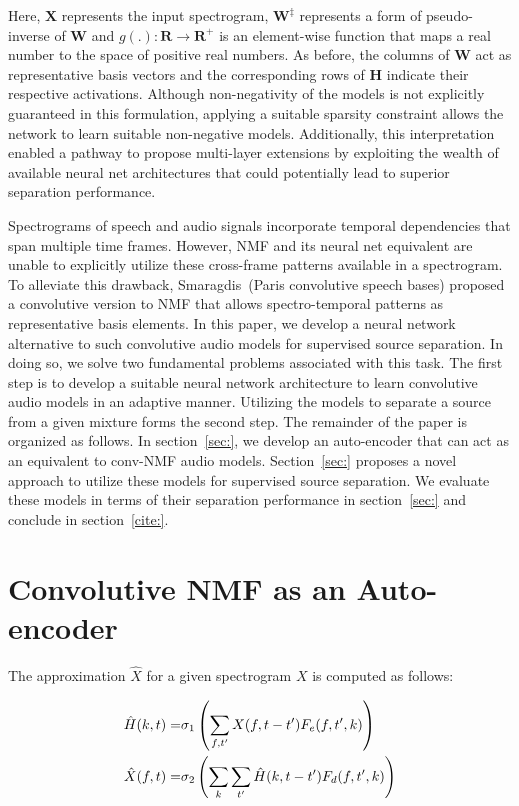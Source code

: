 \documentclass{article}
\begin{document}
Here, $\mathbf{X}$ represents the input spectrogram, $\mathbf{W^{\ddagger}}$ represents a form of pseudo-inverse of $\mathbf{W}$ and $g(.):\mathbf{R}\rightarrow \mathbf{R^{+}}$ is an element-wise function that maps a real number to the space of positive real numbers. As before, the columns of $\mathbf{W}$ act as representative basis vectors and the corresponding rows of $\mathbf{H}$ indicate their respective activations. Although non-negativity of the models is not explicitly guaranteed in this formulation, applying a suitable sparsity constraint allows the network to learn suitable non-negative models. Additionally, this interpretation enabled a pathway to propose multi-layer extensions by exploiting the wealth of available neural net architectures that could potentially lead to superior separation performance. 

Spectrograms of speech and audio signals incorporate temporal dependencies that span multiple time frames. However, NMF and its neural net equivalent are unable to explicitly utilize these cross-frame patterns available in a spectrogram. To alleviate this drawback, Smaragdis~\cite{}(Paris convolutive speech bases) proposed a convolutive version to NMF that allows spectro-temporal patterns as representative basis elements. In this paper, we develop a neural network alternative to such convolutive audio models for supervised source separation. In doing so, we solve two fundamental problems associated with this task. The first step is to develop a suitable neural network architecture to learn convolutive audio models in an adaptive manner. Utilizing the models to separate a source from a given mixture forms the second step. The remainder of the paper is organized as follows. In section~\ref{sec:}, we develop an auto-encoder that can act as an equivalent to conv-NMF audio models. Section~\ref{sec:} proposes a novel approach to utilize these models for supervised source separation. We evaluate these models in terms of their separation performance in section~\ref{sec:} and conclude in section~\ref{cite:}.

\section{Convolutive NMF as an Auto-encoder}
\label{sec:conv-nmf}
The approximation $\hat X$ for a given spectrogram $X$ is computed as follows: 

\begin{align}
	\hat H(k,t) =& \sigma_1\left ( \sum_{f,t'} X(f,t-t') F_e(f,t',k) \right ) \notag \\
	\hat X(f,t) =& \sigma_2 \left ( \sum_k \sum_{t'} \hat H(k,t-t') F_d(f, t',k) \right )
\end{align}
\end{document}
